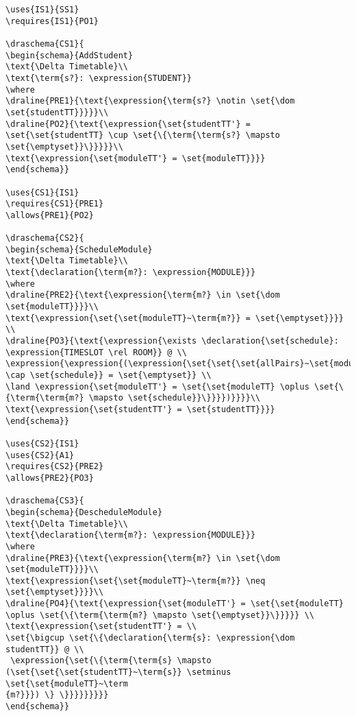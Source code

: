 \begin{verbatim}
\uses{IS1}{SS1}
\requires{IS1}{PO1}

\draschema{CS1}{
\begin{schema}{AddStudent}
\text{\Delta Timetable}\\
\text{\term{s?}: \expression{STUDENT}}
\where
\draline{PRE1}{\text{\expression{\term{s?} \notin \set{\dom \set{studentTT}}}}}\\
\draline{PO2}{\text{\expression{\set{studentTT'} = \set{\set{studentTT} \cup \set{\{\term{\term{s?} \mapsto \set{\emptyset}}\}}}}}\\
\text{\expression{\set{moduleTT'} = \set{moduleTT}}}}
\end{schema}}

\uses{CS1}{IS1}
\requires{CS1}{PRE1}
\allows{PRE1}{PO2}

\draschema{CS2}{
\begin{schema}{ScheduleModule}
\text{\Delta Timetable}\\
\text{\declaration{\term{m?}: \expression{MODULE}}}
\where
\draline{PRE2}{\text{\expression{\term{m?} \in \set{\dom \set{moduleTT}}}}\\
\text{\expression{\set{\set{moduleTT}~\term{m?}} = \set{\emptyset}}}} \\
\draline{PO3}{\text{\expression{\exists \declaration{\set{schedule}: \expression{TIMESLOT \rel ROOM}} @ \\
\expression{\expression{(\expression{\set{\set{\set{allPairs}~\set{moduleTT}} \cap \set{schedule}} = \set{\emptyset}} \\
\land \expression{\set{moduleTT'} = \set{\set{moduleTT} \oplus \set{\{\term{\term{m?} \mapsto \set{schedule}}\}}}})}}}}\\
\text{\expression{\set{studentTT'} = \set{studentTT}}}}
\end{schema}}

\uses{CS2}{IS1}
\uses{CS2}{A1}
\requires{CS2}{PRE2}
\allows{PRE2}{PO3}

\draschema{CS3}{
\begin{schema}{DescheduleModule}
\text{\Delta Timetable}\\
\text{\declaration{\term{m?}: \expression{MODULE}}}
\where
\draline{PRE3}{\text{\expression{\term{m?} \in \set{\dom \set{moduleTT}}}}\\
\text{\expression{\set{\set{moduleTT}~\term{m?}} \neq \set{\emptyset}}}}\\
\draline{PO4}{\text{\expression{\set{moduleTT'} = \set{\set{moduleTT} \oplus \set{\{\term{\term{m?} \mapsto \set{\emptyset}}\}}}}} \\
\text{\expression{\set{studentTT'} = \\
\set{\bigcup \set{\{\declaration{\term{s}: \expression{\dom studentTT}} @ \\
 \expression{\set{\{\term{\term{s} \mapsto (\set{\set{\set{studentTT}~\term{s}} \setminus \set{\set{moduleTT}~\term
{m?}}}) \} \}}}}}}}}}
\end{schema}}


\end{verbatim}
